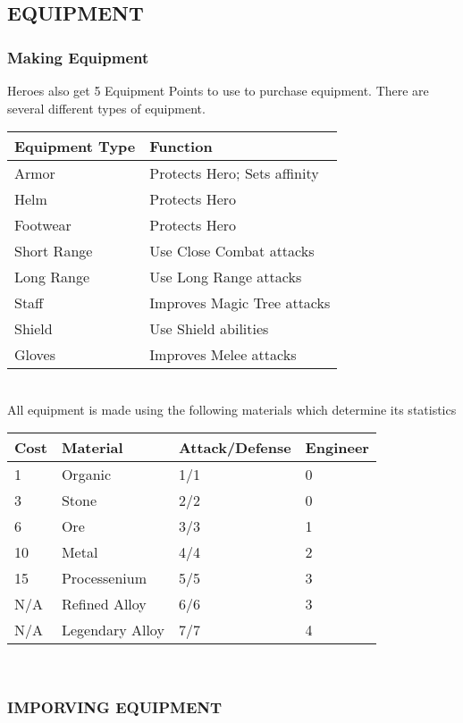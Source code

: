\subsection{EQUIPMENT}
\subsubsection{Making Equipment}
Heroes also get 5 Equipment Points to use to purchase equipment.  There are several different types of equipment.\\
\begin{tabularx}{\textwidth}{X X}
\hline
Equipment Type & Function \\
\hline 
Armor & Protects Hero;  Sets affinity\\
Helm & Protects Hero\\
Footwear & Protects Hero\\ 
Short Range & Use Close Combat attacks\\
Long Range & Use Long Range attacks \\
Staff & Improves Magic Tree attacks\\
Shield & Use Shield abilities\\
Gloves & Improves Melee attacks\\
\hline
\end{tabularx}\\

All equipment is made using the following materials which determine its statistics
\begin{center}
\begin{tabularx}{\textwidth}{X X X X}
\hline
Cost& Material& Attack/Defense & Engineer\\
\hline
1 & Organic & 1/1 & 0\\
3& Stone & 2/2 & 0\\
6& Ore& 3/3& 1\\
10& Metal& 4/4& 2\\
15& Processenium& 5/5& 3\\
N/A& Refined Alloy& 6/6& 3\\
N/A& Legendary Alloy& 7/7& 4\\
\hline
\end{tabularx}\\
\end{center}


\subsubsection{IMPORVING EQUIPMENT}

